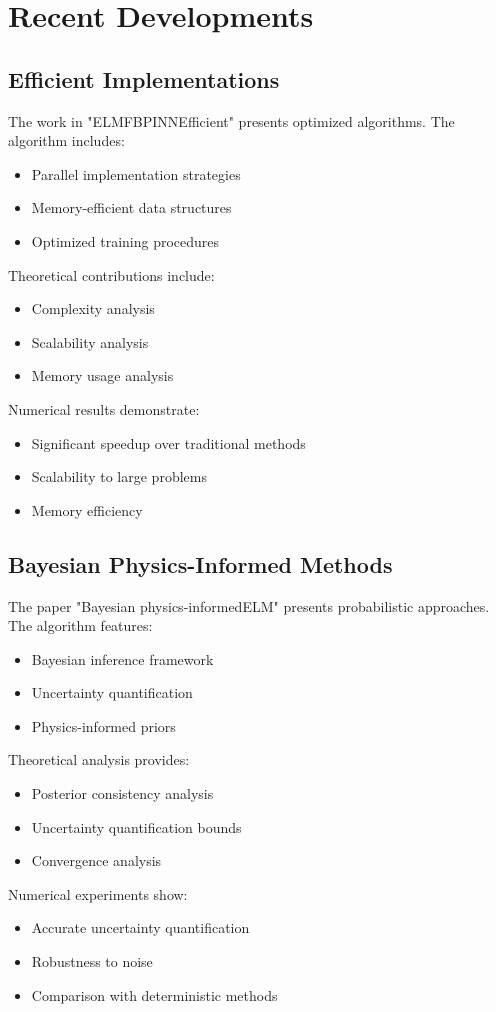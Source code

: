 \documentclass[12pt]{article}
\begin{document}
\section{Recent Developments}
\label{sec:recent}

\subsection{Efficient Implementations}
\label{subsec:efficient}
The work in "ELMFBPINNEfficient" presents optimized algorithms. The algorithm includes:
\begin{itemize}
    \item Parallel implementation strategies
    \item Memory-efficient data structures
    \item Optimized training procedures
\end{itemize}
Theoretical contributions include:
\begin{itemize}
    \item Complexity analysis
    \item Scalability analysis
    \item Memory usage analysis
\end{itemize}
Numerical results demonstrate:
\begin{itemize}
    \item Significant speedup over traditional methods
    \item Scalability to large problems
    \item Memory efficiency
\end{itemize}

\subsection{Bayesian Physics-Informed Methods}
\label{subsec:bayesian}
The paper "Bayesian physics-informedELM" presents probabilistic approaches. The algorithm features:
\begin{itemize}
    \item Bayesian inference framework
    \item Uncertainty quantification
    \item Physics-informed priors
\end{itemize}
Theoretical analysis provides:
\begin{itemize}
    \item Posterior consistency analysis
    \item Uncertainty quantification bounds
    \item Convergence analysis
\end{itemize}
Numerical experiments show:
\begin{itemize}
    \item Accurate uncertainty quantification
    \item Robustness to noise
    \item Comparison with deterministic methods
\end{itemize}
\end{document}
